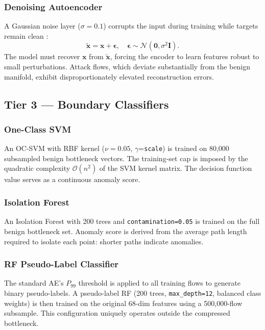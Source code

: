 \documentclass[10pt,journal,compsoc]{IEEEtran}
\begin{document}
\subsubsection{Denoising Autoencoder}
A Gaussian noise layer ($\sigma = 0.1$) corrupts the input during
training while targets remain clean \cite{vincent2010}:
\begin{equation}
  \tilde{\mathbf{x}} = \mathbf{x} + \boldsymbol{\epsilon},
  \quad \boldsymbol{\epsilon} \sim \mathcal{N}(\mathbf{0},
  \sigma^2 \mathbf{I}).
\end{equation}
The model must recover $\mathbf{x}$ from $\tilde{\mathbf{x}}$,
forcing the encoder to learn features robust to small perturbations.
Attack flows, which deviate substantially from the benign manifold,
exhibit disproportionately elevated reconstruction errors.

\subsection{Tier 3 — Boundary Classifiers}

\subsubsection{One-Class SVM}
An OC-SVM \cite{scholkopf2001} with RBF kernel
($\nu=0.05$, $\gamma$=\texttt{scale}) is trained on 80{,}000
subsampled benign bottleneck vectors.  The training-set cap is
imposed by the quadratic complexity $\mathcal{O}(n^2)$ of the
SVM kernel matrix.  The decision function value serves as a
continuous anomaly score.

\subsubsection{Isolation Forest}
An Isolation Forest \cite{liu2008} with 200 trees and
\texttt{contamination=0.05} is trained on the full benign bottleneck
set.  Anomaly score is derived from the average path length required
to isolate each point: shorter paths indicate anomalies.

\subsubsection{RF Pseudo-Label Classifier}
The standard AE's $P_{99}$ threshold is applied to all training
flows to generate binary pseudo-labels.  A pseudo-label RF (200 trees,
\texttt{max\_depth=12}, balanced class weights) is then trained on
the original 68-dim features using a 500{,}000-flow subsample.
This configuration uniquely operates outside the compressed bottleneck.
\end{document}
